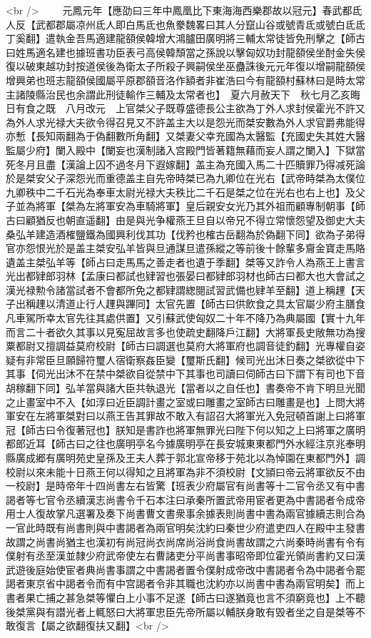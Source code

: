 <br />
　　元鳳元年【應劭曰三年中鳳凰比下東海海西樂郡故以冠元】春武都氐人反【武都郡屬凉州氐人即白馬氐也魚豢魏畧曰其人分竄山谷或號青氐或號白氐氐丁奚翻】遣執金吾馬適建龍頟侯韓增大鴻臚田廣明將三輔太常徒皆免刑擊之【師古曰姓馬適名建也據班書功臣表弓高侯韓頹當之孫說以擊匈奴功封龍頟侯坐酎金失侯復以破東越功封按道侯後為衛太子所殺子興嗣侯坐巫蠱誅後元元年復以增嗣龍頟侯增興弟也班志龍頟侯國屬平原郡頟音洛作額者非崔浩曰今有龍頟村蘇林曰是時太常主諸陵縣治民也余謂此刑徒輸作三輔及太常者也】　夏六月赦天下　秋七月乙亥晦日有食之既　八月改元　上官桀父子既尊盛德長公主欲為丁外人求封侯霍光不許又為外人求光禄大夫欲令得召見又不許盖主大以是怨光而桀安數為外人求官爵弗能得亦慙【長知兩翻為于偽翻數所角翻】又桀妻父幸充國為太醫監【充國史失其姓大醫監屬少府】闌入殿中【闌妄也漢制諸入宫殿門皆著籍無藉而妄人謂之闌入】下獄當死冬月且盡【漢論上囚不過冬月下遐嫁翻】盖主為充國入馬二十匹贖罪乃得减死論於是桀安父子深怨光而重德盖主自先帝時桀已為九卿位在光右【武帝時桀為太僕位九卿秩中二千石光為奉車太尉光禄大夫秩比二千石是桀之位在光右也右上也】及父子並為將軍【桀為左將軍安為車騎將軍】皇后親安女光乃其外祖而顧專制朝事【師古曰顧猶反也朝直遥翻】由是與光争權燕王旦自以帝兄不得立常懷怨望及御史大夫桑弘羊建造酒榷鹽鐵為國興利伐其功【伐矜也榷古岳翻為於偽翻下同】欲為子弟得官亦怨恨光於是盖主桀安弘羊皆與旦通謀旦遣孫縱之等前後十餘輩多齎金寶走馬賂遺盖主桀弘羊等【師占曰走馬馬之善走者也遺于季翻】桀等又詐令人為燕王上書言光出都肄郎羽林【孟康曰都試也肄習也張晏曰都肄郎羽材也師古曰都大也大會試之漢光禄勲令諸當試者不會都所免之都肄謂緫閱試習武備也肄羊至翻】道上稱䟆【天子出稱䟆以清道止行人䟆與蹕同】太官先置【師古曰供飲食之具太官屬少府主膳食凡車駕所幸太官先往其處供置】又引蘇武使匈奴二十年不降乃為典屬國【實十九年而言二十者欲久其事以見寃屈故言多也使疏史翻降戶江翻】大將軍長史敞無功為搜粟都尉又擅調益莫府校尉【師古曰調選也莫府大將軍府也調音徒釣翻】光專權自姿疑有非常臣旦願歸符璽人宿衛察姦臣變【璽斯氏翻】候司光出沐日奏之桀欲從中下其事【伺光出沐不在禁中桀欲自從禁中下其事也司讀曰伺師古曰下謂下有司也下音胡稼翻下同】弘羊當與諸大臣共執退光【當者以之自任也】書奏帝不肯下明旦光聞之止畫室中不入【如淳曰近臣調計畫之室或曰雕畫之室師古曰雕畫是也】上問大將軍安在左將軍桀對曰以燕王告其罪故不敢入有詔召大將軍光入免冠頓首謝上曰將軍冠【師古曰令復著冠也】朕知是書詐也將軍無罪光曰陛下何以知之上曰將軍之廣明都郎近耳【師古曰之往也廣明亭名今據廣明亭在長安城東東都門外水經注京兆奉明縣廣成郷有廣明苑史皇孫及王夫人葬于郭北宣帝移于苑北以為悼園在東都門外】調校尉以來未能十日燕王何以得知之且將軍為非不須校尉【文頴曰帝云將軍欲反不由一校尉】是時帝年十四尚書左右皆驚【班表少府屬官有尚書等十二官令丞又有中書謁者等七官令丞續漢志尚書令千石本注曰承秦所置武帝用宦者更為中書謁者令成帝用士人復故掌凡選署及奏下尚書曹文書衆事余據表則尚書中書為兩官據續志則合為一官此時既有尚書則與中書謁者為兩官明矣沈約曰秦世少府遣吏四人在殿中主發書故謂之尚書尚猶主也漢初有尚冠尚衣尚席尚浴尚食尚書故謂之六尚秦時尚書有令有僕射有丞至漢並隸少府武帝使左右曹諸吏分平尚書事昭帝即位霍光領尚書約又曰漢武遊後庭始使宦者典尚書事謂之中書謁者置令僕射成帝改中書謁者令為中謁者令罷謁者東京省中謁者令而有中宫謁者令非其職也沈約亦以尚書中書為兩官明矣】而上書者果亡捕之甚急桀等懼白上小事不足遂【師古曰遂猶竟也言不須窮竟也】上不聽後桀黨與有譛光者上輒怒曰大將軍忠臣先帝所屬以輔朕身敢有毁者坐之自是桀等不敢復言【屬之欲翻復扶又翻】<br />
